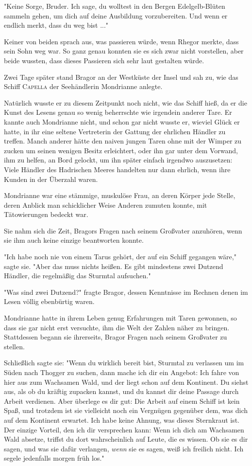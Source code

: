 \documentclass[10pt, a4paper, oneside]{book}
\begin{document}
\begin{multicols}{2}
"Keine Sorge, Bruder. Ich sage, du wolltest in den Bergen Edelgelb-Blüten sammeln gehen, um dich auf deine Ausbildung vorzubereiten. Und wenn er endlich merkt, dass du weg bist ..." 

Keiner von beiden sprach aus, was passieren würde, wenn Rhegor merkte, dass sein Sohn weg war. So ganz genau konnten sie es sich zwar nicht vorstellen, aber beide wussten, dass dieses Passieren sich sehr laut gestalten würde. 

Zwei Tage später stand Bragor an der Westküste der Insel und sah zu, wie das Schiff \textsc{Capella} der Seehändlerin Mondrianne anlegte. 

Natürlich wusste er zu diesem Zeitpunkt noch nicht, wie das Schiff hieß, da er die Kunst des Lesens genau so wenig beherrschte wie irgendein anderer Tare. Er kannte auch Mondrianne nicht, und schon gar nicht wusste er, wieviel Glück er hatte, in ihr eine seltene Vertreterin der Gattung der ehrlichen Händler zu treffen. Manch anderer hätte den naiven jungen Taren ohne mit der Wimper zu zucken um seinen wenigen Besitz erleichtert, oder ihn gar unter dem Vorwand, ihm zu helfen, an Bord gelockt, um ihn später einfach irgendwo auszusetzen: Viele Händler des Hadrischen Meeres handelten nur dann ehrlich, wenn ihre Kunden in der Überzahl waren. 

Mondrianne war eine stämmige, muskulöse Frau, an deren Körper jede Stelle, deren Anblick man schicklicher Weise Anderen zumuten konnte, mit Tätowierungen bedeckt war. 

Sie nahm sich die Zeit, Bragors Fragen nach seinem Großvater anzuhören, wenn sie ihm auch keine einzige beantworten konnte. 

"Ich habe noch nie von einem Tarus gehört, der auf ein Schiff gegangen wäre," sagte sie. "Aber das muss nichts heißen. Es gibt mindestens zwei Dutzend Händler, die regelmäßig das Sturmtal aufsuchen." 

"Was sind zwei Dutzend?" fragte Bragor, dessen Kenntnisse im Rechnen denen im Lesen völlig ebenbürtig waren. 

Mondrianne hatte in ihrem Leben genug Erfahrungen mit Taren gewonnen, so dass sie gar nicht erst versuchte, ihm die Welt der Zahlen näher zu bringen. Stattdessen begann sie ihrerseits, Bragor Fragen nach seinem Großvater zu stellen. 

Schließlich sagte sie: "Wenn du wirklich bereit bist, Sturmtal zu verlassen um im Süden nach Thogger zu suchen, dann mache ich dir ein Angebot: Ich fahre von hier aus zum Wachsamen Wald, und der liegt schon auf dem Kontinent. Du siehst aus, als ob du kräftig zupacken kannst, und du kannst dir deine Passage durch Arbeit verdienen. Aber überlege es dir gut: Die Arbeit auf einem Schiff ist kein Spaß, und trotzdem ist sie vielleicht noch ein Vergnügen gegenüber dem, was dich auf dem Kontinent erwartet. Ich habe keine Ahnung, was dieses Sternkraut ist. Der einzige Vorteil, den ich dir versprechen kann: Wenn ich dich am Wachsamen Wald absetze, triffst du dort wahrscheinlich auf Leute, die es wissen. Ob sie es dir sagen, und was sie dafür verlangen, \textit{wenn} sie es sagen, weiß ich freilich nicht. Ich segele jedenfalls morgen früh los." 


\end{multicols}
\end{document}
